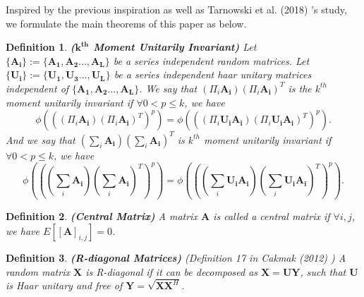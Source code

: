\documentclass[10pt,journal,compsoc]{IEEEtran}
\newtheorem{definition}{Definition}[section]
\begin{document}
Inspired by the previous inspiration as well as Tarnowski et al. (2018) \cite{tarnowski2018dynamical}'s study, we formulate the main theorems of this paper as below.

\begin{definition}
\textbf{($\mathbf{k^{th}}$ Moment Unitarily Invariant)} Let $\{\mathbf{A_i}\} := \{\mathbf{A_1}, \mathbf{A_2}...,\mathbf{A_L}\}$ be a series independent random matrices. Let $\{\mathbf{U_i}\}:=\{\mathbf{U_1}, \mathbf{U_3}...,\mathbf{U_L}\}$ be a series independent haar unitary matrices independent of  $\{\mathbf{A_1}, \mathbf{A_2}...,\mathbf{A_L}\}$.
We say that $(\Pi_{i} \mathbf{A_i})(\Pi_{i} \mathbf{A_i})^T$ is the $k^{th}$ moment unitarily invariant if $\forall 0<p\le k$, we have
\begin{equation}
    \phi\left(\left((\Pi_{i} \mathbf{A_i})(\Pi_{i} \mathbf{A_i})^T\right)^p\right) = \phi\left(\left((\Pi_{i} \mathbf{U_iA_i})(\Pi_{i} \mathbf{U_iA_i})^T\right)^p\right).
\end{equation}
And we say that $(\sum_{i} \mathbf{A_i})(\sum_{i} \mathbf{A_i})^T$ is $k^{th}$ moment unitarily invariant if $\forall 0<p\le k$, we have
\begin{equation}
    \phi\!\left(\!\left(\!(\sum_{i}\! \mathbf{A_i})\!(\sum_{i} \mathbf{A_i})^T\!\right)^p\!\right)\! =\! \phi\!\left(\!\left(\!(\!\sum_{i}\! \mathbf{U_i}\mathbf{A_i})(\sum_{i} \mathbf{U_i}\!\mathbf{A_i}\!)^T\!\right)^p\!\right).
\end{equation}
\label{def:moment_unitary_invariant}
\end{definition}

\begin{definition}
\textbf{(Central Matrix)} A matrix $\mathbf{A}$ is called a central matrix if  $\forall i, j$, we have $E[[\mathbf{A}]_{i,j}]=0$.
\label{def:central_matrix}
\end{definition}

\begin{definition}
\textbf{(R-diagonal Matrices)} (Definition 17 in Cakmak (2012) \cite{cakmak2012non}) A random matrix $\mathbf{X}$ is R-diagonal if it can be decomposed as $\mathbf{X}=\mathbf{UY}$, such that $\mathbf{U}$ is Haar unitary and free of $\mathbf{Y}=\sqrt{\mathbf{XX}^H}$. 
\label{def:R-diagonal}
\end{definition}
\end{document}
